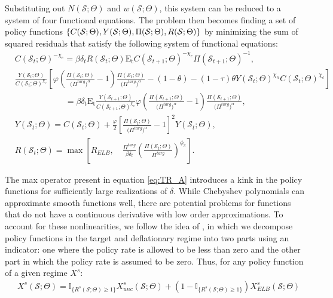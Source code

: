 \documentclass[11pt]{article}
\begin{document}
\begin{singlespace}
	\noindent
	Substituting out $N(\mathcal{S};\Theta)$ and $w(\mathcal{S};\Theta)$, this system can be reduced to a system of four functional equations. The problem then becomes finding a set of policy functions $\{C(\mathcal{S};\Theta),Y(\mathcal{S};\Theta),\\ \Pi(\mathcal{S};\Theta), R(\mathcal{S};\Theta)\}$ by minimizing the sum of squared residuals that satisfy the following system of functional equations: 
	    \begin{align}
		& C(\mathcal{S}_{t};\Theta)^{-\chi_{c}} = \beta\delta_{t}R(\mathcal{S}_{t};\Theta)\mathrm{E_{t}}C(\mathcal{S}_{t+1};\Theta)^{-\chi_{c}}\Pi(\mathcal{S}_{t+1};\Theta)^{-1},\label{eq:CEE_A}\\
		& \frac{Y(\mathcal{S}_{t};\Theta)}{C(\mathcal{S}_{t};\Theta)^{\chi_{c}}}\left[\varphi \left(\frac{\Pi(\mathcal{S}_{t};\Theta)}{\bigl(\Pi^{targ}\bigr)^{\alpha}}-1\right)\frac{\Pi(\mathcal{S}_{t};\Theta)}{\bigl(\Pi^{targ}\bigr)^{\alpha}} - (1-\theta)- (1-\tau)\theta Y(\mathcal{S}_{t};\Theta)^{\chi_{n}}C(\mathcal{S}_{t};\Theta)^{\chi_{c}}\right]\\ \nonumber
		& \hspace{6em}= \beta\delta_{t}\mathrm{E_{t}}\frac{Y(\mathcal{S}_{t+1};\Theta)}{C(\mathcal{S}_{t+1};\Theta)^{\chi_{c}}}\varphi \left(\frac{\Pi(\mathcal{S}_{t+1};\Theta)}{\bigl(\Pi^{targ}\bigr)^{\alpha}}-1\right)\frac{\Pi(\mathcal{S}_{t+1};\Theta)}{\bigl(\Pi^{targ}\bigr)^{\alpha}},\\
		& Y(\mathcal{S}_{t};\Theta) = C(\mathcal{S}_{t};\Theta) + \frac{\varphi}{2}\left[\frac{\Pi(\mathcal{S}_{t};\Theta)}{\bigl(\Pi^{targ}\bigr)^{\alpha}}-1\right]^{2}Y(\mathcal{S}_{t};\Theta),\label{eq:ARC_A}\\
		& R(\mathcal{S}_{t};\Theta) = \max \left[R_{ELB}, \quad\frac{\Pi^{targ}}{\beta\delta_t}\left(\frac{\Pi(\mathcal{S}_{t};\Theta)}{\Pi^{targ}}\right)^{\phi_{\pi}}\right].\label{eq:TR_A}
	\end{align}
	
	The max operator present in equation \ref{eq:TR_A} introduces a kink in the policy functions for sufficiently large realizations of $\delta$. While Chebyshev polynomials can approximate smooth functions well, there are potential problems for functions that do not have a continuous derivative with low order approximations. To account for these nonlinearities, we follow the idea of \citet{ChristianoFisher2000}, in which we decompose policy functions in the target and deflationary regime into two parts using an indicator: one where the policy rate is allowed to be less than zero and the other part in which the policy rate is assumed to be zero. Thus, for any policy function of a given regime $X^s$:
	\begin{align}
	    & X^s(\mathcal{S};\Theta) = \mathbb{I}_{\{R^s(\mathcal{S};\Theta)\ge 1\}}X_{unc}^{s}(\mathcal{S};\Theta) + (1 - \mathbb{I}_{\{R^s(\mathcal{S};\Theta)\ge 1\}})X_{ELB}^{s}(\mathcal{S};\Theta)
	\end{align}
	

\end{singlespace}
\end{document}
